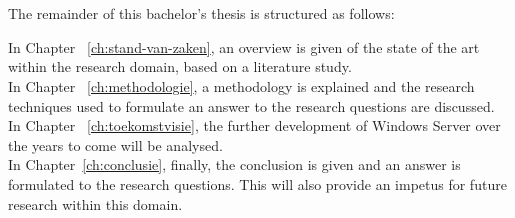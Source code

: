 \section{}
\label{sec:opzet-bachelorproef}

The remainder of this bachelor's thesis is structured as follows:

In Chapter ~\ref{ch:stand-van-zaken}, an overview is given of the state of the art within the research domain, based on a literature study.
\\

In Chapter ~\ref{ch:methodologie}, a methodology is explained and the research techniques used to formulate an answer to the research questions are discussed.
\\

In Chapter ~\ref{ch:toekomstvisie}, the further development of Windows Server over the years to come will be analysed. 
\\

In Chapter~\ref{ch:conclusie}, finally, the conclusion is given and an answer is formulated to the research questions. This will also provide an impetus for future research within this domain.
\\
